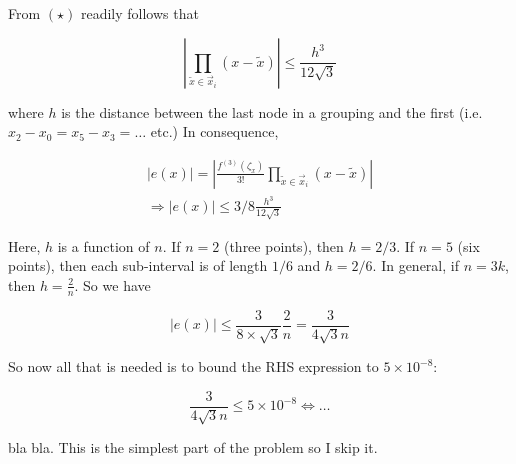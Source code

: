 \documentclass[12pt]{article}
\theoremstyle{definition}
\begin{document}
From $( \star )$ readily follows that 

\begin{equation*}
    \left| \prod_{\widetilde{ x } \in \overrightarrow{x}_i }(x-\widetilde{ x } )
    \right| \leq \frac{ h^3 }{12\sqrt{3} }
\end{equation*}

where $h$ is the distance between the last node in a grouping and the first
(i.e. $x_2 - x_0 = x_5 - x_3 = \ldots$ etc.) In consequence, 


\begin{align*}
    \left| e(x) \right| = \left|\frac{ f^{(3)}(\zeta_x) }{3!}\prod_{\widetilde{ x }
    \in \overrightarrow{x}_i } (x-\widetilde{ x } )\right| \\ 
    \Rightarrow \left| e(x) \right| \leq  3 / 8 \frac{h^3}{12\sqrt{3} }
\end{align*}

Here, $h$ is a function of $n$. If $n = 2$ (three points), then $h = 2/3$.
If $n = 5$ (six points), then each sub-interval is of length $1 / 6$ and $h =
2/6$. In general, if $n = 3k$, then $h = \frac{2}{n}$. So we have 

\begin{equation*}
    \left| e(x) \right|  \leq \frac{ 3 }{8\times \sqrt{3} } \frac{2}{n} =
    \frac{3}{4\sqrt{3}n }
\end{equation*}

So now all that is needed is to bound the RHS expression to $5 \times 10^{-8}$:

\begin{equation*}
    \frac{3}{4\sqrt{3}n } \leq 5\times 10^{-8} \iff \ldots
\end{equation*}

bla bla. This is the simplest part of the problem so I skip it.
\end{document}
